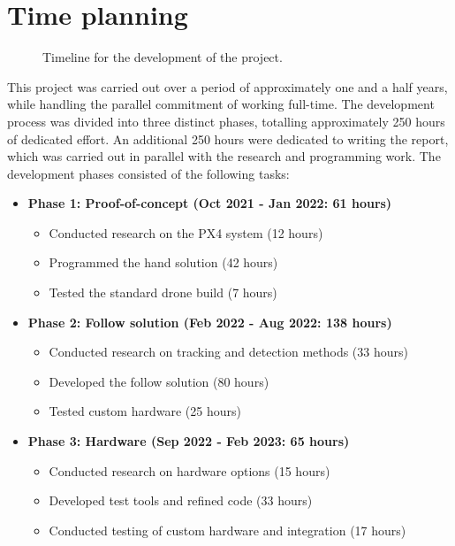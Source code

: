 \section{Time planning}
\label{sec:time-planning}

\begin{figure}[H]
  \centering
  \caption{Timeline for the development of the project.}
  \label{fig:project-timeline}
\end{figure}

This project was carried out over a period of approximately one and a half years, while handling the parallel commitment of working full-time. The development process was divided into three distinct phases, totalling approximately 250 hours of dedicated effort. An additional 250 hours were dedicated to writing the report, which was carried out in parallel with the research and programming work. The development phases consisted of the following tasks:

\begin{itemize}
\item \textbf{Phase 1: Proof-of-concept (Oct 2021 - Jan 2022: 61 hours)}
\begin{itemize}
\item Conducted research on the PX4 system (12 hours)
\item Programmed the hand solution (42 hours)
\item Tested the standard drone build (7 hours)
\end{itemize}

\item \textbf{Phase 2: Follow solution (Feb 2022 - Aug 2022: 138 hours)}
\begin{itemize}
    \item Conducted research on tracking and detection methods (33 hours)
    \item Developed the follow solution (80 hours)
    \item Tested custom hardware (25 hours)
\end{itemize}

\item \textbf{Phase 3: Hardware (Sep 2022 - Feb 2023: 65 hours)}
\begin{itemize}
    \item Conducted research on hardware options (15 hours)
    \item Developed test tools and refined code (33 hours)
    \item Conducted testing of custom hardware and integration (17 hours)
\end{itemize}
\end{itemize}

